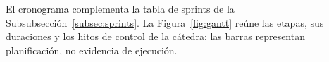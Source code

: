 \label{annex:diagramas}

El cronograma complementa la tabla de sprints de la Subsubsección~\ref{subsec:sprints}. La Figura~\ref{fig:gantt} reúne las etapas, sus duraciones y los hitos de control de la cátedra; las barras representan planificación, no evidencia de ejecución.

